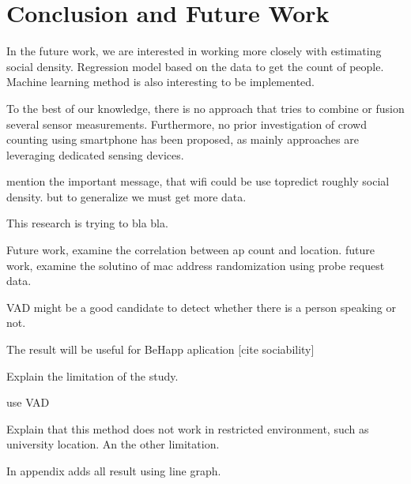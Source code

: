 \chapter{Conclusion and Future Work}
\label{ch:conclusion-future-work} %
In the future work, we are interested in working more closely with estimating social density. Regression model based on the data to get the count of people. Machine learning method is also interesting to be implemented.

To the best of our knowledge, there is no approach that tries to combine or fusion several sensor measurements. Furthermore, no prior investigation of crowd counting using smartphone has been proposed, as mainly approaches are leveraging dedicated sensing devices.

mention the important message, that wifi could be use topredict roughly social density. but to generalize we must get more data.

This research is trying to bla bla.

Future work, examine the correlation between ap count and location.
future work, examine the solutino of mac address randomization using probe request data.

VAD might be a good candidate to detect whether there is a person speaking or not.

The result will be useful for BeHapp aplication [cite sociability]

Explain the limitation of the study.

use VAD

Explain that this method does not work in restricted environment, such as university location.
An the other limitation.

In appendix adds all result using line graph.

